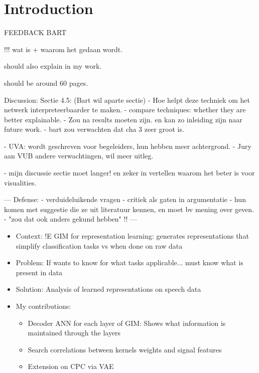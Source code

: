 \chapter{Introduction}

FEEDBACK BART

!!!
wat is + waarom het gedaan wordt.

should also explain in my work.

should be around 60 pages.

Discussion:
Sectie 4.5: (Bart wil aparte sectie)
- Hoe helpt deze techniek om het netwerk interpreteerbaarder te maken.
- compare techniques: whether they are better explainable.
- Zou na results moeten zijn. en kan zo inleiding zijn naar future work.
- bart zou verwachten dat cha 3 zeer groot is.

- UVA: wordt geschreven voor begeleiders, hun hebben meer achtergrond.
- Jury aan VUB andere verwachtingen, wil meer uitleg.

- mijn discussie sectie moet langer! en zeker in vertellen waarom het beter is voor visualities.

---
Defense:
- verduideluikende vragen
- critiek als gaten in argumentatie
- hun komen met suggestie die ze uit literatuur kennen, en moet bv mening over geven.
- "zou dat ook anders gekund hebben"
!!
---




\begin{itemize}
	\item Context: !E GIM for representation learning: generates representations that simplify classification tasks vs when done on raw data
	\item Problem: If wants to know for what tasks applicable... must know what is present in data
	\item Solution: Analysis of learned representations on speech data
	\item My contributions: 
	\begin{itemize}
		\item Decoder ANN for each layer of GIM: Shows what information is maintained through the layers
		\item Search correlations between kernels weights and signal features
		\item Extension on CPC via VAE
	\end{itemize}
\end{itemize}



